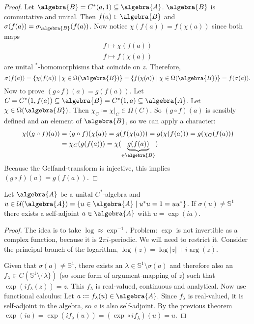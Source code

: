 \documentclass[a4paper]{article}
\newcommand{\unitcircle}{\mathds{S}^1}
\begin{document}
\begin{proof}
	Let $\algebra{B} = C^*(a,1) \subseteq \algebra{A}$.
	$\algebra{B}$ is commutative and unital.
	Then $f(a) \in \algebra{B}$ and $\sigma(f(a)) = \sigma_\algebra{B}(f(a))$. Now notice $\chi(f(a)) = f(\chi(a))$ since both maps 
	\begin{align*}
		f \mapsto \chi(f(a)) \\
		f \mapsto f(\chi(a))
	\end{align*}
	are unital $^*$-homomorphisms that coincide on $z$.
	Therefore,
	\begin{equation*}
		\sigma(f(a)) = \{ \chi(f(a)) \mid \chi \in \Omega(\algebra{B}) \} = \{ f(\chi(a)) \mid \chi \in \Omega(\algebra{B})\} = f(\sigma(a))	\text{.}
	\end{equation*}
	Now to prove $(g \circ f)(a) = g(f(a))$.
	Let $C = C^*(1, f(a)) \subseteq \algebra{B} = C^*(1,a) \subseteq \algebra{A}$.
	Let $\chi \in \Omega(\algebra{B})$. 
	Then $\chi_C \coloneq \chi|_C \in \Omega(C)$.
	So $(g \circ f)(a)$ is sensibly defined and an element of $\algebra{B}$, so we can apply a character:
	\begin{align*}
		\chi((g \circ f)(a)) &= (g \circ f)(\chi(a)) = g(f(\chi(a))) = g(\chi(f(a))) = g(\chi_C(f(a)))\\ &= \chi_C(g(f(a))) = \chi(\underbrace{g(f(a))}_{\in \algebra{B}})
	\end{align*}
	Because the Gelfand-transform is injective, this implies $(g \circ f)(a) = g(f(a))$.
\end{proof}

\begin{proposition}
	Let $\algebra{A}$ be a unital $C^*$-algebra and $u \in \mathcal{U}(\algebra{A}) = \{ u \in \algebra{A} \mid u^* u = 1 = u u^*\}$.
	If $\sigma(u) \neq \unitcircle$ there exists a self-adjoint $a \in \algebra{A}$ with $u = \exp(i a)$.
\end{proposition}

\begin{proof}
	The idea is to take $\log \approx \exp^{-1}$.
	Problem: $\exp$ is not invertible as a complex function, because it is $2 \pi i$-periodic.
	We will need to restrict it.
	Consider the principal branch of the logarithm, $\log(z) = \log |z| + i \arg(z)$.

	Given that $\sigma(a) \neq \unitcircle$, there exists an $\lambda \in \unitcircle \setminus \sigma(a)$ and therefore also an $f_\lambda \in C(\unitcircle \setminus \{\lambda\})$ (so some form of argument-mapping of $z$) such that $\exp(i f_\lambda(z)) = z$.
	This $f_\lambda$ is real-valued, continuous and analytical.
	Now use functional calculus:
	Let $a \coloneq f_\lambda(u) \in \algebra{A}$.
	Since $f_\lambda$ is real-valued, it is self-adjoint in the algebra, so $a$ is also self-adjoint.
	By the previous theorem $\exp(i a ) = \exp(i f_\lambda(u)) = (\exp \circ i f_\lambda)(u) = u$.	


\end{proof}
\end{document}
